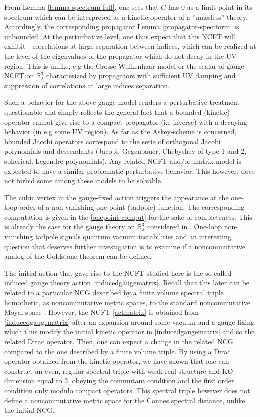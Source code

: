 \documentclass[a4paper,11pt,twoside]{article}
\numberwithin{equation}{section}
\theoremstyle{nonumberplain}
\begin{document}
From Lemma \ref{lemma-spectrum-full}, one sees that $G$ has $0$ as a limit point in its spectrum which can be interpreted as a kinetic operator of a ''massless'' theory. Accordingly, the corresponding propagator Lemma \ref{propagator-spectform} is unbounded. At the perturbative level, one thus expect that this NCFT will exhibit - correlations at large separation between indices, which can be realized at the level of the eigenvalues of the propagator which do not decay in the UV region. This is unlike, e.g the Grosse-Wulkenhaar model \cite{gw1,gw2} or the scalar of gauge NCFT on $\mathbb{R}^3_\lambda$ \cite{gvw13} characterized by propagators with sufficient UV damping and suppression of correlations at large indices separation.\par
Such a behavior for the above gauge model renders a perturbative treatment questionable and simply reflects the general fact that a bounded (kinetic) operator cannot give rise to a compact propagator (i.e inverse) with a decaying behavior (in e.g some UV region). As far as the Askey-scheme is concerned, bounded Jacobi operators correspond to the serie of orthogonal Jacobi polynomials and descendants (Jacobi, Gegenbauer, Chebyshev of type 1 and 2, spherical, Legendre polynomials). Any related NCFT and/or matrix model is expected to have a similar problematic perturbative behavior. This however, does not forbid some among these models to be solvable.\par

The cubic vertex in the gauge-fixed action triggers the appearance at the one-loop order of a non-vanishing one-point (tadpole) function. The corresponding computation is given in the \ref{onepoint-comput} for the sake of completeness. This is already the case for the gauge theory on $\mathbb{R}^3_\lambda$ considered in \cite{gvw13}. One-loop non-vanishing tadpole signals quantum vacuum instabilities and an interesting question that deserves further investigation is to examine if a noncommutative analog of the Goldstone theorem can be defined.\par

The initial action that gave rise to the NCFT studied here is the so called induced gauge theory action \eqref{inducedgaugematrix}. Recall that this later can be related to a particular NCG described by a finite volume spectral triple \cite{finite-vol} homothetic, as noncommutative metric spaces, to the standard noncommutative Moyal space \cite{homot-moyal}. However, the NCFT \eqref{actmatrix} is obtained from \eqref{inducedgaugematrix} after an expansion around some vacuum and a gauge-fixing which thus modify the initial kinetic operator in \eqref{inducedgaugematrix} and so the related Dirac operator. Then, one can expect a change in the related NCG compared to the one described by a finite volume triple. By using a Dirac operator obtained from the kinetic operator, we have shown that one can construct an even, regular spectral triple with weak real structure and KO-dimension equal to 2, obeying the commutant condition and the first order condition only modulo compact operators. This spectral triple however does not define a noncommutative metric space for the Connes spectral distance, unlike the initial NCG.\par
\end{document}
